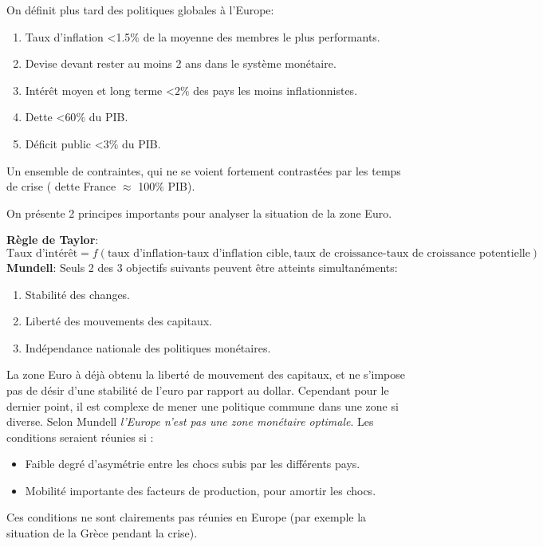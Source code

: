 On définit plus tard des politiques globales à l'Europe: 
\begin{enumerate}
	\item Taux d'inflation <1.5$\%$ de la moyenne des membres le plus performants.
	\item Devise devant rester au moins 2 ans dans le système monétaire.
	\item Intérêt moyen et long terme <$2\%$ des pays les moins inflationnistes.
	\item Dette <$60\%$ du PIB.
	\item Déficit public <$3\%$ du PIB.
	
\end{enumerate}

Un ensemble de contraintes, qui ne se voient fortement contrastées par les temps de crise ( dette France $\approx$ 100$\%$ PIB).

On présente 2 principes importants pour analyser la situation de la zone Euro. 
\newline

\textbf{Règle de Taylor}: 	
\[
	\text{Taux d'intérêt}= f(\text{taux d'inflation-taux d'inflation cible},\text{taux de croissance-taux de croissance potentielle})
\]
\textbf{Mundell}: Seuls 2 des 3 objectifs suivants peuvent être atteints simultanéments: 
\begin{enumerate}
	\item Stabilité des changes.
	\item Liberté des mouvements des capitaux.
	\item Indépendance nationale des politiques monétaires. 
\end{enumerate}

La zone Euro à déjà obtenu la liberté de mouvement des capitaux, et ne s'impose pas de désir d'une stabilité de l'euro par rapport au dollar. Cependant pour le
dernier point, il est complexe de mener une politique commune dans une zone si diverse. Selon Mundell \emph{l'Europe n'est pas une zone monétaire optimale}.
Les conditions seraient réunies si : 
\begin{itemize}
	\item Faible degré d'asymétrie entre les chocs subis par les différents pays.
	\item Mobilité importante des facteurs de production, pour amortir les chocs. 
\end{itemize}
Ces conditions ne sont clairements pas réunies en Europe (par exemple la situation de la Grèce pendant la crise).
